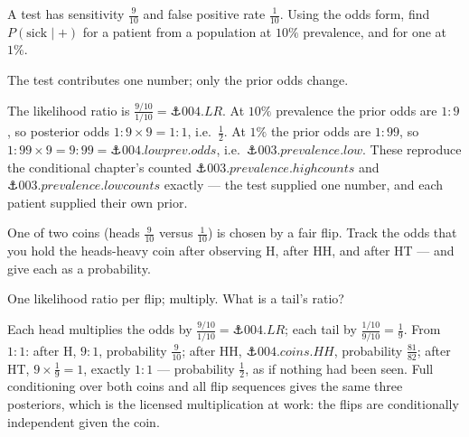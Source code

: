 \begin{problem}
A test has sensitivity $\tfrac{9}{10}$ and false positive rate
$\tfrac{1}{10}$. Using the odds form, find $P(\text{sick} \mid +)$ for
a patient from a population at $10\%$ prevalence, and for one at
$1\%$.
\begin{hint}
The test contributes one number; only the prior odds change.
\end{hint}
\begin{solution}
The likelihood ratio is $\tfrac{9/10}{1/10} = \anchor{004.LR}$. At
$10\%$ prevalence the prior odds are $1{:}9$, so posterior odds
$1{:}9 \times 9 = 1{:}1$, i.e.\ $\tfrac12$. At $1\%$ the prior odds
are $1{:}99$, so $1{:}99 \times 9 = 9{:}99 =
\anchor{004.lowprev.odds}$, i.e.\ $\anchor{003.prevalence.low}$.
These reproduce the conditional chapter's counted
$\anchor{003.prevalence.highcounts}$ and
$\anchor{003.prevalence.lowcounts}$ exactly — the test supplied one
number, and each patient supplied their own prior.
\end{solution}
\end{problem}

\begin{problem}
One of two coins (heads $\tfrac{9}{10}$ versus $\tfrac{1}{10}$) is
chosen by a fair flip. Track the odds that you hold the heads-heavy
coin after observing H, after HH, and after HT — and give each as a
probability.
\begin{hint}
One likelihood ratio per flip; multiply. What is a tail's ratio?
\end{hint}
\begin{solution}
Each head multiplies the odds by $\tfrac{9/10}{1/10} = \anchor{004.LR}$;
each tail by $\tfrac{1/10}{9/10} = \tfrac19$. From $1{:}1$: after H,
$9{:}1$, probability $\tfrac{9}{10}$; after HH,
$\anchor{004.coins.HH}$, probability $\tfrac{81}{82}$; after HT,
$9 \times \tfrac19 = 1$, exactly $1{:}1$ — probability $\tfrac12$, as
if nothing had been seen. Full conditioning over both coins and all
flip sequences gives the same three posteriors, which is the licensed
multiplication at work: the flips are conditionally independent given
the coin.
\end{solution}
\end{problem}

